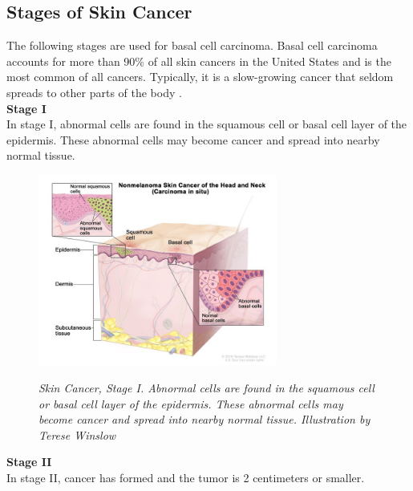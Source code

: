 \newpage

\subsection{Stages of Skin Cancer}

The following stages are used for basal cell carcinoma. Basal cell carcinoma accounts for more than 90\% of all skin cancers in the United States and is the most common of all cancers. Typically, it is a slow-growing cancer that seldom spreads to other parts of the body \cite{CancerInstitute}. \\

\textbf{Stage I} \\

In stage I, abnormal cells are found in the squamous cell or basal cell layer of the epidermis. These abnormal cells may become cancer and spread into nearby normal tissue. 

\begin{figure}[H]
\centering
\includegraphics[width=0.7\textwidth]{imatges/problem_domain/phase0-skin-cancer.jpg}
\caption[Skin Cancer, Stage I]{\textit{Skin Cancer, Stage I. Abnormal cells are found in the squamous cell or basal cell layer of the epidermis. These abnormal cells may become cancer and spread into nearby normal tissue. Illustration by Terese Winslow}}
{\label{fig:stage0-skin-canceer}}
\end{figure}

\textbf{Stage II} \\

In stage II, cancer has formed and the tumor is 2 centimeters or smaller. 

